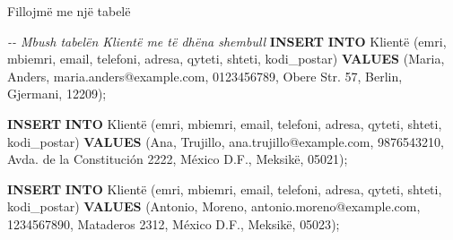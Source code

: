\documentclass[
  ignorenonframetext,
]{beamer}
\newenvironment{Shaded}{\begin{snugshade}}{\end{snugshade}}
\newcommand{\CommentTok}[1]{\textcolor[rgb]{0.56,0.35,0.01}{\textit{#1}}}
\newcommand{\KeywordTok}[1]{\textcolor[rgb]{0.13,0.29,0.53}{\textbf{#1}}}
\newcommand{\NormalTok}[1]{#1}
\newcommand{\StringTok}[1]{\textcolor[rgb]{0.31,0.60,0.02}{#1}}
\begin{document}
\begin{frame}[fragile]{Fillojmë me një tabelë}
\label{fillojmuxeb-me-njuxeb-tabeluxeb-7}

\begin{Shaded}
\begin{Highlighting}[]
\CommentTok{{-}{-} Mbush tabelën Klientë me të dhëna shembull}
\KeywordTok{INSERT} \KeywordTok{INTO}\NormalTok{ Klientë (emri, mbiemri, email, telefoni, adresa, qyteti, shteti, kodi\_postar)}
\KeywordTok{VALUES}\NormalTok{ (}\StringTok{\textquotesingle{}Maria\textquotesingle{}}\NormalTok{, }\StringTok{\textquotesingle{}Anders\textquotesingle{}}\NormalTok{, }\StringTok{\textquotesingle{}maria.anders@example.com\textquotesingle{}}\NormalTok{, }\StringTok{\textquotesingle{}0123456789\textquotesingle{}}\NormalTok{, }\StringTok{\textquotesingle{}Obere Str. 57\textquotesingle{}}\NormalTok{, }\StringTok{\textquotesingle{}Berlin\textquotesingle{}}\NormalTok{, }\StringTok{\textquotesingle{}Gjermani\textquotesingle{}}\NormalTok{, }\StringTok{\textquotesingle{}12209\textquotesingle{}}\NormalTok{);}

\KeywordTok{INSERT} \KeywordTok{INTO}\NormalTok{ Klientë (emri, mbiemri, email, telefoni, adresa, qyteti, shteti, kodi\_postar)}
\KeywordTok{VALUES}\NormalTok{ (}\StringTok{\textquotesingle{}Ana\textquotesingle{}}\NormalTok{, }\StringTok{\textquotesingle{}Trujillo\textquotesingle{}}\NormalTok{, }\StringTok{\textquotesingle{}ana.trujillo@example.com\textquotesingle{}}\NormalTok{, }\StringTok{\textquotesingle{}9876543210\textquotesingle{}}\NormalTok{, }\StringTok{\textquotesingle{}Avda. de la Constitución 2222\textquotesingle{}}\NormalTok{, }\StringTok{\textquotesingle{}México D.F.\textquotesingle{}}\NormalTok{, }\StringTok{\textquotesingle{}Meksikë\textquotesingle{}}\NormalTok{, }\StringTok{\textquotesingle{}05021\textquotesingle{}}\NormalTok{);}

\KeywordTok{INSERT} \KeywordTok{INTO}\NormalTok{ Klientë (emri, mbiemri, email, telefoni, adresa, qyteti, shteti, kodi\_postar)}
\KeywordTok{VALUES}\NormalTok{ (}\StringTok{\textquotesingle{}Antonio\textquotesingle{}}\NormalTok{, }\StringTok{\textquotesingle{}Moreno\textquotesingle{}}\NormalTok{, }\StringTok{\textquotesingle{}antonio.moreno@example.com\textquotesingle{}}\NormalTok{, }\StringTok{\textquotesingle{}1234567890\textquotesingle{}}\NormalTok{, }\StringTok{\textquotesingle{}Mataderos 2312\textquotesingle{}}\NormalTok{, }\StringTok{\textquotesingle{}México D.F.\textquotesingle{}}\NormalTok{, }\StringTok{\textquotesingle{}Meksikë\textquotesingle{}}\NormalTok{, }\StringTok{\textquotesingle{}05023\textquotesingle{}}\NormalTok{);}


\end{Highlighting}
\end{Shaded}
\end{frame}
\end{document}
